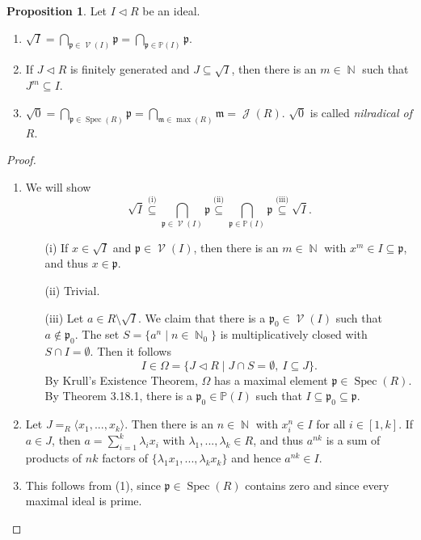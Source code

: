 \documentclass[12pt,a4paper]{report}
\theoremstyle{definition}
\newtheorem{proposition}[theorem]{Proposition}
\theoremstyle{num.custom-title}
\DeclareMathOperator{\J}{\mathcal{J}}
\DeclareMathOperator{\N}{\mathbb{N}}
\DeclareMathOperator{\V}{\mathcal{V}}
\DeclareMathOperator{\sm}{\setminus}
\DeclareMathOperator{\sse}{\subseteq}
\DeclareMathOperator{\Spec}{Spec}
\newcommand{\p}{\mathfrak{p}}
\newcommand{\m}{\mathfrak{m}}
\renewcommand{\P}{\mathbb{P}}
\begin{document}
\begin{proposition}
Let $I \lhd R$ be an ideal.
\begin{enumerate}
\item $\displaystyle \sqrt{I} = \bigcap_{\p \in \V(I)} \p = \bigcap_{\p \in \P(I)} \p$.
\item If $J \lhd R$ is finitely generated and $J \sse \sqrt{I}$, then there is an $m \in \N$ such that $J^m \sse I$.
\item $\displaystyle \sqrt{0} = \bigcap_{\p \in \Spec(R)} \p = \bigcap_{\m \in \max(R)} \m = \J(R)$. $\sqrt{0}$ is called \emph{nilradical of $R$}.
\end{enumerate}
\begin{proof}\ 
\begin{enumerate}
\item We will show
\[
\sqrt{I} \stackrel{\text{(i)}}{\sse} \bigcap_{\p \in \V(I)} \p \stackrel{\text{(ii)}}{\sse} \bigcap_{\p \in \P(I)} \p \stackrel{\text{(iii)}}{\sse} \sqrt{I}.
\]
\begin{enumerate}
\item[(i)] If $x \in \sqrt{I}$ and $\p \in \V(I)$, then there is an $m \in \N$ with $x^m \in I \sse \p$, and thus $x \in \p$.
\item[(ii)] Trivial.
\item[(iii)] Let $a \in R \sm \sqrt{I}$. We claim that there is a $\p_0 \in \V(I)$ such that $a \not\in \p_0$. The set $S=\{a^n \mid n \in \N_0 \}$ is multiplicatively closed with $S \cap I = \emptyset$. Then it follows
\[
I \in \Omega = \{ J \lhd R \mid J \cap S = \emptyset, \ I \sse J \}.
\]
By Krull's Existence Theorem, $\Omega$ has a maximal element $\p \in \Spec(R)$. By Theorem 3.18.1, there is a $\p_0 \in \P(I)$ such that $I \sse \p_0 \sse \p$.
\end{enumerate}
\item Let $J = _R \langle x_1,...,x_k \rangle$. Then there is an $n \in \N$ with $x_i^n \in I$ for all $i \in [1,k]$. If $a \in J$, then $a = \sum_{i=1}^k \lambda_i x_i$ with $\lambda_1,...,\lambda_k \in R$, and thus $a^{nk}$ is a sum of products of $nk$ factors of $\{\lambda_1 x_1,...,\lambda_k x_k\}$ and hence $a^{nk} \in I$.
\item This follows from (1), since $\p \in \Spec(R)$ contains zero and since every maximal ideal is prime.
\end{enumerate}
\end{proof}
\end{proposition}
\end{document}
